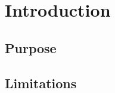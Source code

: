 \documentclass[ExampleMasters.tex]{subfiles}
\begin{document}
\chapter{Introduction}


\section{Purpose}


\section{Limitations}
\end{document}
